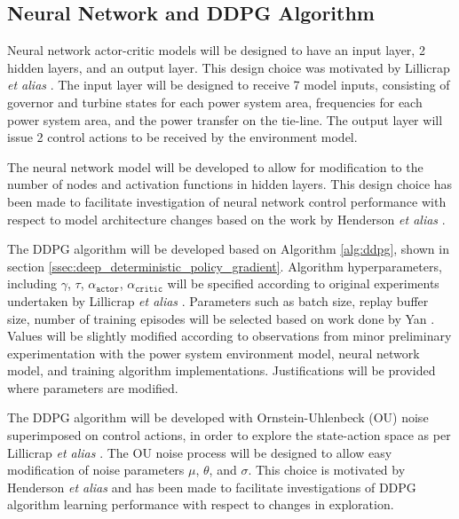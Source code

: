 \subsection{Neural Network and DDPG Algorithm}
Neural network actor-critic models will be designed to have an input layer, 2 hidden layers, and an output layer. This design choice was motivated by Lillicrap \textit{et alias} \cite{Lillicrap2015}. The input layer will be designed to receive 7 model inputs, consisting of governor and turbine states for each power system area, frequencies for each power system area, and the power transfer on the tie-line. The output layer will issue 2 control actions to be received by the environment model.

The neural network model will be developed to allow for modification to the number of nodes and activation functions in hidden layers. This design choice has been made to facilitate investigation of neural network control performance with respect to model architecture changes based on the work by Henderson \textit{et alias} \cite{Henderson2017}.

The DDPG algorithm will be developed based on Algorithm \ref{alg:ddpg}, shown in section \ref{ssec:deep_deterministic_policy_gradient}. Algorithm hyperparameters, including $\gamma$, $\tau$, $\alpha_{\texttt{actor}}$, $\alpha_{\texttt{critic}}$ will be specified according to original experiments undertaken by Lillicrap \textit{et alias} \cite{Lillicrap2015}. Parameters such as batch size, replay buffer size, number of training episodes will be selected based on work done by Yan \cite{Yan2019}. Values will be slightly modified according to observations from minor preliminary experimentation with the power system environment model, neural network model, and training algorithm implementations. Justifications will be provided where parameters are modified.

The DDPG algorithm will be developed with Ornstein-Uhlenbeck (OU) noise superimposed on control actions, in order to explore the state-action space as per Lillicrap \textit{et alias} \cite{Lillicrap2015}. The OU noise process will be designed to allow easy modification of noise parameters $\mu$, $\theta$, and $\sigma$. This choice is motivated by Henderson \textit{et alias} \cite{Henderson2017} and has been made to facilitate investigations of DDPG algorithm learning performance with respect to changes in exploration.



